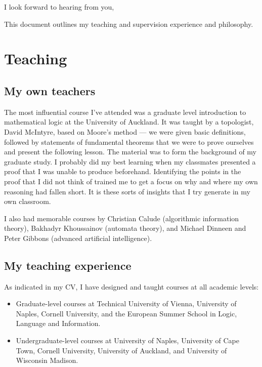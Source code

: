 \documentclass[10,a4paper,sans]{moderncv}
\begin{document}
\date{December, 2017}
\opening{\vspace{-13mm}}
\closing{I look forward to hearing from you, \vspace{-1cm}}

\makelettertitle

This document outlines my teaching and supervision experience and philosophy.

\section{Teaching}

\subsection{My own teachers}

The most influential course I've attended was a graduate level introduction to
mathematical logic at the University of Auckland.  It was taught by a topologist, David McIntyre, based on Moore's method --- 
we were given basic definitions, followed by statements of
fundamental theorems that we were to prove ourselves and present the following
lesson. The material was to form the background of my
graduate study. I probably did my best learning when my classmates presented a
proof that I was unable to produce beforehand. Identifying the points in the proof that I
did not think of trained me to get a focus on why and where my own reasoning
had fallen short. It is these sorts of insights that I try generate in my own classroom. 

I also had memorable courses by Christian Calude (algorithmic information theory), Bakhadyr Khoussainov (automata theory), and 
Michael Dinneen and Peter Gibbons (advanced artificial intelligence). 

\subsection{My teaching experience}

As indicated in my CV, I have designed and taught courses at all academic levels:
\begin{itemize}
 \item Graduate-level courses at Technical University of Vienna, University of Naples, Cornell University, and the European Summer School in Logic, Language and Information. 
 \item Undergraduate-level courses at University of Naples, University of Cape Town, Cornell University, University of Auckland, and University of Wisconsin Madison.
\end{itemize}
\end{document}
